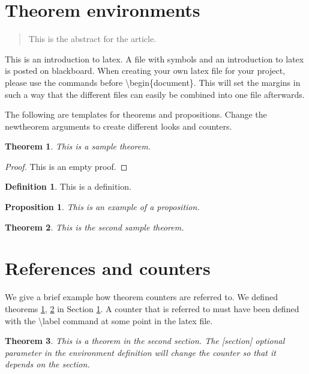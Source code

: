 \documentclass[11pt,reqno]{amsart}
\theoremstyle{plain}
\newtheorem{thm}{Theorem}[section]
\newtheorem{prop}{Proposition}
\theoremstyle{definition}
\newtheorem*{defi}{Definition}
\begin{document}
\section{Theorem environments}\label{intro}


\begin{abstract}
This is the abstract for the article.
\end{abstract}

This is an introduction to latex. A file with symbols and an introduction to latex is posted on blackboard. When creating your own latex file for your project, please use the commands before \textbackslash{}begin\{document\}. This will set the margins in such a way that the different files can easily be combined into one file afterwards.

The following are templates for theorems and propositions. Change the newtheorem arguments to create different looks and counters.

\begin{thm}\label{th1} This is a sample theorem.
\end{thm}

\begin{proof} This is an empty proof.
\end{proof}

\begin{defi} This is a definition.
\end{defi}

\begin{prop} This is an example of a proposition.
\end{prop}

\begin{thm}\label{th2} This is the second sample theorem.
\end{thm}

\section{References and counters}


We give a brief example how theorem counters are referred to. We defined theorems \ref{th1}, \ref{th2} in Section \ref{intro}. A counter that is referred to must have been defined with the \textbackslash{}label command at some point in the latex file.

\begin{thm} This is a theorem in the second section. The [section] optional parameter in the environment definition will change the counter so that it depends on the section.
\end{thm}
\end{document}
